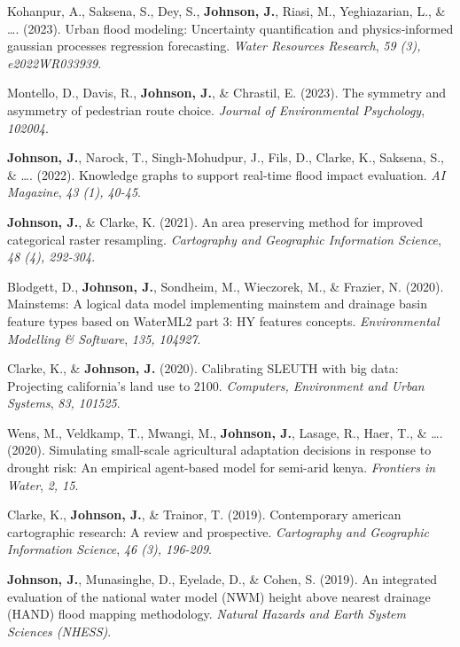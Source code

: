 \documentclass[11pt,a4paper,]{awesome-cv}
\begin{document}
\leavevmode{}%
Kohanpur, A., Saksena, S., Dey, S., \textbf{Johnson, J.}, Riasi, M.,
Yeghiazarian, L., \& \ldots. (2023). Urban flood modeling: Uncertainty
quantification and physics‐informed gaussian processes regression
forecasting. \emph{Water Resources Research}, \emph{59 (3),
e2022WR033939}.

\leavevmode{}%
Montello, D., Davis, R., \textbf{Johnson, J.}, \& Chrastil, E. (2023).
The symmetry and asymmetry of pedestrian route choice. \emph{Journal of
Environmental Psychology}, \emph{102004}.

\leavevmode{}%
\textbf{Johnson, J.}, Narock, T., Singh-Mohudpur, J., Fils, D., Clarke,
K., Saksena, S., \& \ldots. (2022). Knowledge graphs to support
real-time flood impact evaluation. \emph{AI Magazine}, \emph{43 (1),
40-45}.

\leavevmode{}%
\textbf{Johnson, J.}, \& Clarke, K. (2021). An area preserving method
for improved categorical raster resampling. \emph{Cartography and
Geographic Information Science}, \emph{48 (4), 292-304}.

\leavevmode{}%
Blodgett, D., \textbf{Johnson, J.}, Sondheim, M., Wieczorek, M., \&
Frazier, N. (2020). Mainstems: A logical data model implementing
mainstem and drainage basin feature types based on WaterML2 part 3: HY
features concepts. \emph{Environmental Modelling \& Software},
\emph{135, 104927}.

\leavevmode{}%
Clarke, K., \& \textbf{Johnson, J.} (2020). Calibrating SLEUTH with big
data: Projecting california's land use to 2100. \emph{Computers,
Environment and Urban Systems}, \emph{83, 101525}.

\leavevmode{}%
Wens, M., Veldkamp, T., Mwangi, M., \textbf{Johnson, J.}, Lasage, R.,
Haer, T., \& \ldots. (2020). Simulating small-scale agricultural
adaptation decisions in response to drought risk: An empirical
agent-based model for semi-arid kenya. \emph{Frontiers in Water},
\emph{2, 15}.

\leavevmode{}%
Clarke, K., \textbf{Johnson, J.}, \& Trainor, T. (2019). Contemporary
american cartographic research: A review and prospective.
\emph{Cartography and Geographic Information Science}, \emph{46 (3),
196-209}.

\leavevmode{}%
\textbf{Johnson, J.}, Munasinghe, D., Eyelade, D., \& Cohen, S. (2019).
An integrated evaluation of the national water model (NWM) height above
nearest drainage (HAND) flood mapping methodology. \emph{Natural Hazards
and Earth System Sciences (NHESS)}.
\end{document}
